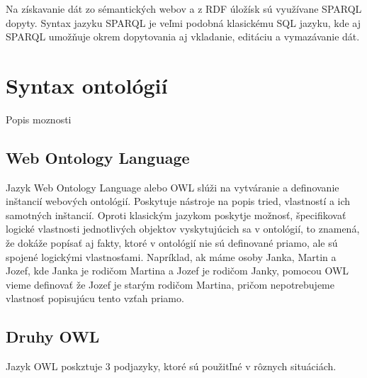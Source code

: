 \documentclass[12pt, a4paper, oneside]{book}
\begin{document}

Na získavanie dát zo sémantických webov a z RDF úložísk sú využívane SPARQL dopyty. Syntax jazyku SPARQL je veľmi podobná klasickému SQL jazyku, kde aj SPARQL umožňuje okrem dopytovania aj vkladanie, editáciu a vymazávanie dát.







\section{Syntax ontológií}
Popis moznosti

\subsection{Web Ontology Language}
Jazyk Web Ontology Language alebo OWL slúži na vytváranie a definovanie inštancií webových ontológií. Poskytuje nástroje na popis tried, vlastností a ich samotných inštancií. Oproti klasickým jazykom poskytje možnosť, špecifikovať logické vlastnosti jednotlivých objektov vyskytujúcich sa v ontológií, to znamená, že dokáže popísať aj fakty, ktoré v ontológií nie sú definované priamo, ale sú spojené logickými vlastnosťami. Napríklad, ak máme osoby Janka, Martin a Jozef, kde Janka je rodičom Martina a Jozef je rodičom Janky, pomocou OWL vieme definovať že Jozef je starým rodičom Martina, pričom nepotrebujeme vlastnosť popisujúcu tento vzťah priamo.


\subsection{Druhy OWL}
Jazyk OWL poskztuje 3 podjazyky, ktoré sú použitľné v rôznych situáciách.
\end{document}

